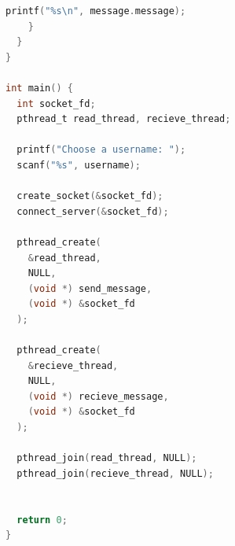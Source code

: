 \begin{lstlisting}[language=C]
      printf("%s\n", message.message);
    }
  }
} 

int main() {
  int socket_fd;
  pthread_t read_thread, recieve_thread;

  printf("Choose a username: ");
  scanf("%s", username);

  create_socket(&socket_fd);
  connect_server(&socket_fd);
  
  pthread_create(
    &read_thread,
    NULL,
    (void *) send_message,
    (void *) &socket_fd
  );

  pthread_create(
    &recieve_thread,
    NULL,
    (void *) recieve_message,
    (void *) &socket_fd
  );

  pthread_join(read_thread, NULL);
  pthread_join(recieve_thread, NULL);


  return 0;
}
\end{lstlisting}

